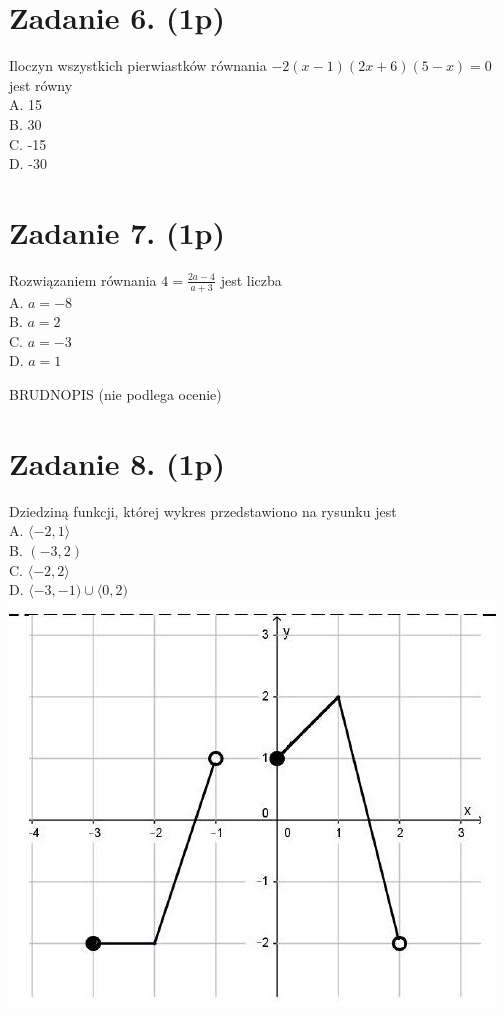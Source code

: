 \documentclass[10pt]{article}
\begin{document}
\section*{Zadanie 6. (1p)}
Iloczyn wszystkich pierwiastków równania \(-2(x-1)(2 x+6)(5-x)=0\) jest równy\\
A. 15\\
B. 30\\
C. -15\\
D. -30

\section*{Zadanie 7. (1p)}
Rozwiązaniem równania \(4=\frac{2 a-4}{a+3}\) jest liczba\\
A. \(a=-8\)\\
B. \(a=2\)\\
C. \(a=-3\)\\
D. \(a=1\)

BRUDNOPIS (nie podlega ocenie)

\section*{Zadanie 8. (1p)}
Dziedziną funkcji, której wykres przedstawiono na rysunku jest\\
A. \(\langle-2,1\rangle\)\\
B. \((-3,2)\)\\
C. \(\langle-2,2\rangle\)\\
D. \(\langle-3,-1) \cup\langle 0,2)\)\\
\includegraphics[max width=\textwidth, center]{2024_11_21_2a465a6670163fcfd70dg-04}
\end{document}
